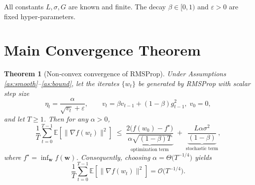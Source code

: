 \documentclass{article}
\newtheorem{theorem}{Theorem}
\newcommand{\E}{\mathbb{E}}
\begin{document}
All constants $L,\sigma,G$ are known and finite. The decay $\beta\in[0,1)$ and $\varepsilon>0$ are fixed hyper‑parameters.

\section*{Main Convergence Theorem}
\begin{theorem}[Non‑convex convergence of RMSProp]\label{thm:main}
Under Assumptions \ref{as:smooth}–\ref{as:bound}, let the iterates $\{w_{t}\}$ be generated by RMSProp with scalar step size
\[
\eta_{t}= \frac{\alpha}{\sqrt{v_{t}}+\varepsilon},
\qquad v_{t}= \beta v_{t-1}+(1-\beta)g_{t-1}^{2},\;v_{0}=0,
\]
and let $T\ge1$. Then for any $\alpha>0$,
\[
\frac{1}{T}\sum_{t=0}^{T-1}\E\!\left[\|\nabla f(w_{t})\|^{2}\right]
\;\le\;
\underbrace{\frac{2\bigl(f(w_{0})-f^{\star}\bigr)}{\alpha\sqrt{(1-\beta)T}}}_{\text{optimization term}}
\;+\;
\underbrace{\frac{L\alpha\sigma^{2}}{(1-\beta)}}_{\text{stochastic term}},
\tag{1}
\]
where $f^{\star}= \inf_{\mathbf{w}} f(\mathbf{w})$.
Consequently, choosing $\alpha =\Theta\!\bigl(T^{-1/4}\bigr)$ yields
\[
\frac{1}{T}\sum_{t=0}^{T-1}\E\!\left[\|\nabla f(w_{t})\|^{2}\right]=\mathcal{O}\!\bigl(T^{-1/4}\bigr).
\]
\end{theorem}
\end{document}
